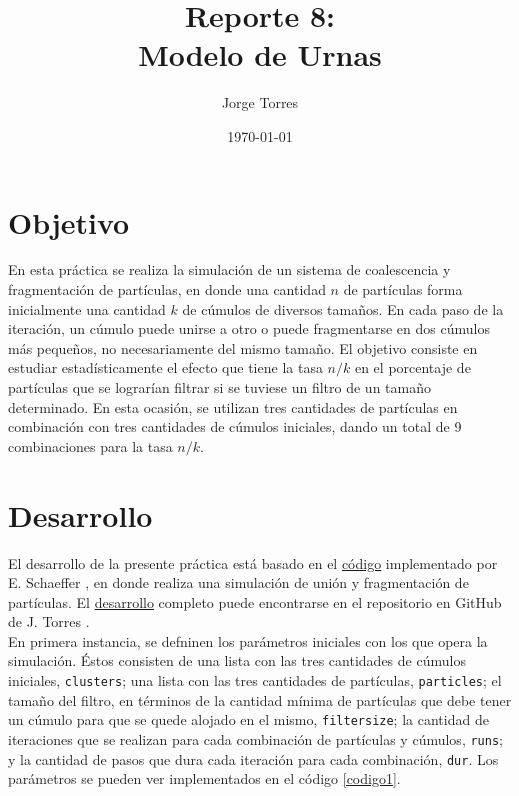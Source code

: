 \documentclass{article}
\title{Reporte 8:\\Modelo de Urnas}
\author{Jorge Torres}
\date{\today}
\begin{document}
\maketitle

\section{Objetivo}\label{obj}
En esta pr\'actica se realiza la simulaci\'on de un sistema de coalescencia y fragmentaci\'on de part\'iculas, en donde una cantidad $n$ de part\'iculas forma inicialmente una cantidad $k$ de c\'umulos de diversos tama\~nos. En cada paso de la iteraci\'on, un c\'umulo puede unirse a otro o puede fragmentarse en dos c\'umulos m\'as peque\~nos, no necesariamente del mismo tama\~no. El objetivo consiste en estudiar estad\'isticamente el efecto que tiene la tasa $n/k$ en el porcentaje de part\'iculas que se lograr\'ian filtrar si se tuviese un filtro de un tama\~no determinado. En esta ocasi\'on, se utilizan tres cantidades de part\'iculas en combinaci\'on con tres cantidades de c\'umulos iniciales, dando un total de 9 combinaciones para la tasa $n/k$.

\section{Desarrollo}\label{des}
El desarrollo de la presente pr\'actica est\'a basado en el \href{https://github.com/satuelisa/Simulation/blob/master/UrnModel/aggrFrag.py}{c\'odigo} implementado por E. Schaeffer \cite{elisa1}, en donde realiza una simulaci\'on de uni\'on y fragmentaci\'on de part\'iculas. El \href{https://github.com/FeroxDeitas/Simulacion-Nano/blob/main/Tareas/P8/urnas.py}{desarrollo} completo puede encontrarse en el repositorio en GitHub de J. Torres \cite{jorge1}.\\

En primera instancia, se defninen los par\'ametros iniciales con los que opera la simulaci\'on. \'Estos consisten de una lista con las tres cantidades de c\'umulos iniciales, \texttt{clusters}; una lista con las tres cantidades de part\'iculas, \texttt{particles}; el tama\~no del filtro, en t\'erminos de la cantidad m\'inima de part\'iculas que debe tener un c\'umulo para que se quede alojado en el mismo, \texttt{filtersize}; la cantidad de iteraciones que se realizan para cada combinaci\'on de part\'iculas y c\'umulos, \texttt{runs}; y la cantidad de pasos que dura cada iteraci\'on para cada combinaci\'on, \texttt{dur}. Los par\'ametros se pueden ver implementados en el c\'odigo \ref{codigo1}.
\end{document}
